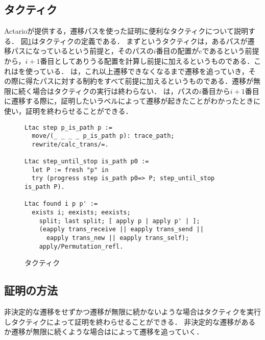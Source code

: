 \subsection{タクティク}

Actarioが提供する，遷移パスを使った証明に便利なタクティクについて説明する．
図\ref{code:proof:tactics}はタクティクの定義である．
まずというタクティクは，あるパスが遷移パスになっているという前提と，そのパスの$i$番目の配置が$c$であるという前提から，$i + 1$番目としてありうる配置を計算し前提に加えるというものである．これはを使っている．
は，これ以上遷移できなくなるまで遷移を追っていき，その際に得たパスに対する制約をすべて前提に加えるというものである．遷移が無限に続く場合はタクティクの実行は終わらない．
は，パスの$i$番目から$i + 1$番目に遷移する際に，証明したいラベルによって遷移が起きたことがわかったときに使い，証明を終わらせることができる．

\begin{figure}
\begin{lstlisting}
Ltac step p_is_path p :=
  move/(_ _ _ _ p_is_path p): trace_path;
  rewrite/calc_trans/=.

Ltac step_until_stop is_path p0 :=
  let P := fresh "p" in
  try (progress step is_path p0=> P; step_until_stop is_path P).

Ltac found i p p' :=
  exists i; eexists; eexists;
    split; last split; [ apply p | apply p' | ];
    (eapply trans_receive || eapply trans_send ||
      eapply trans_new || eapply trans_self);
    apply/Permutation_refl.
\end{lstlisting}
\caption{タクティク}\label{code:proof:tactics}
\end{figure}

\subsection{証明の方法}

非決定的な遷移をせずかつ遷移が無限に続かないような場合はタクティクを実行しタクティクによって証明を終わらせることができる．
非決定的な遷移があるか遷移が無限に続くような場合はによって遷移を追っていく．
